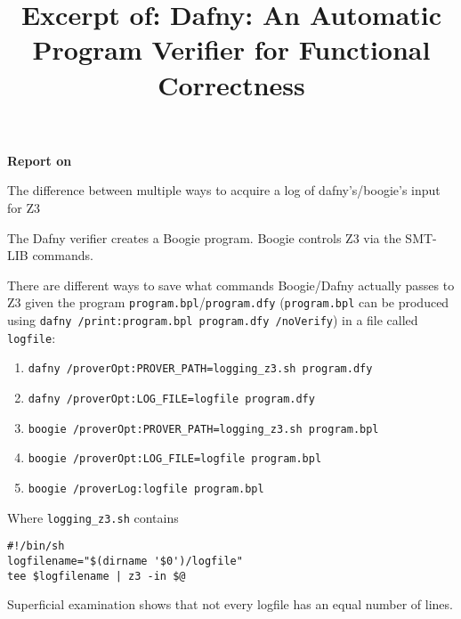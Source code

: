 \documentclass{scrartcl}
\title{Excerpt of: Dafny: An Automatic Program Verifier for Functional Correctness}
\begin{document}
\begin{center}
    \Large{\textbf{Report on}}

    \LARGE{The difference between multiple ways to acquire a log of dafny's/boogie's input
    for Z3}
\end{center}

\vspace{1cm}

The Dafny verifier creates a Boogie program.
Boogie controls Z3 via the SMT-LIB commands.

There are different ways to save what commands Boogie/Dafny actually passes to Z3
given the program \lstinline|program.bpl|/\lstinline|program.dfy|
(\lstinline|program.bpl| can be produced using
\lstinline|dafny /print:program.bpl program.dfy /noVerify|)
in a file called \lstinline|logfile|:
\begin{enumerate}
    \item \lstinline|dafny /proverOpt:PROVER_PATH=logging_z3.sh program.dfy|
        \label{dafny_intercepted}
    \item \lstinline|dafny /proverOpt:LOG_FILE=logfile program.dfy|
        \label{dafny_proveroption}
    \item \lstinline|boogie /proverOpt:PROVER_PATH=logging_z3.sh program.bpl|
        \label{boogie_intercepted}
    \item \lstinline|boogie /proverOpt:LOG_FILE=logfile program.bpl|
        \label{boogie_proveroption}
    \item \lstinline|boogie /proverLog:logfile program.bpl|
        \label{boogie_boogieoption}
\end{enumerate}

Where \lstinline|logging_z3.sh| contains

\begin{lstlisting}[frame=single]
#!/bin/sh
logfilename="$(dirname '$0')/logfile"
tee $logfilename | z3 -in $@
\end{lstlisting}

Superficial examination shows that not every logfile has an equal number of lines.
\end{document}

